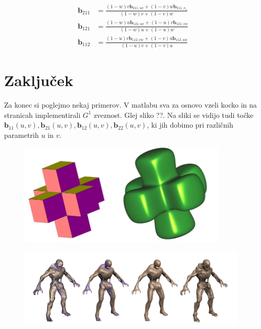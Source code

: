 \documentclass[a4paper,12pt]{article}
\newcommand{\tbf}{\textbf}
\begin{document}
\begin{align*}
\tbf{b}_{211} &= \frac{(1-w)v \tbf{b}_{211,uv}+(1-v)w\tbf{b}_{211,v_1}}{(1-w)v+(1-v)w} \\
\tbf{b}_{121} &= \frac{(1-w)u \tbf{b}_{121,uv}+(1-u)v\tbf{b}_{121,vw}}{(1-w)u+(1-u)w} \\
\tbf{b}_{112} &= \frac{(1-u)v \tbf{b}_{112,vw}+(1-v)u\tbf{b}_{112,uw}}{(1-u)v+(1-v)u} 
\end{align*}

\section{Zaključek}
Za konec si poglejmo nekaj primerov. V matlabu sva za osnovo vzeli kocko in na stranicah implementirali $G^1$ zveznost. Glej sliko ??. Na sliki se vidijo tudi točke $\tbf{b}_{11}(u,v), \tbf{b}_{21}(u,v), \tbf{b}_{12}(u,v), \tbf{b}_{22}(u,v)$, ki jih dobimo pri različnih parametrih $u$ in $v$.


\begin{figure}[h]
	\centering
	\includegraphics[width=10cm]{posebna_kocka.jpg}
\end{figure}


\begin{figure}[h]
	\centering
	\includegraphics[width=11cm]{koncni_primer.png}
\end{figure}
\end{document}
